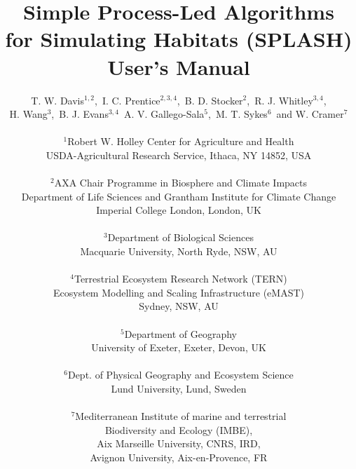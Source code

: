 \documentclass[11pt,twoside,a4paper,titlepage]{article}
\newcommand*{\TitleFont}{%
      \usefont{\encodingdefault}{\rmdefault}{b}{n}%
      \fontsize{16}{20}%
      \selectfont}
\begin{document}
\title{\TitleFont Simple Process-Led Algorithms\\ for Simulating Habitats (SPLASH)\\ User's Manual}
\author{
         T. W. Davis$^{1,2}$,~I. C. Prentice$^{2,3,4}$,~B. D. Stocker$^{2}$,~R. J. Whitley$^{3,4}$,\\
         H. Wang$^{3}$,~B. J. Evans$^{3,4}$~A. V. Gallego-Sala$^{5}$,~M. T. Sykes$^{6}$~and W. Cramer$^{7}$\\
         \\
         $^{1}$Robert W. Holley Center for Agriculture and Health\\
         USDA-Agricultural Research Service, Ithaca, NY 14852, USA\\
         \\
         $^{2}$AXA Chair Programme in Biosphere and Climate Impacts\\
         Department of Life Sciences and Grantham Institute for Climate Change\\
         Imperial College London, London, UK\\
         \\
         $^{3}$Department of Biological Sciences\\
         Macquarie University, North Ryde, NSW, AU\\
         \\
         $^{4}$Terrestrial Ecosystem Research Network (TERN)\\ 
         Ecosystem Modelling and Scaling Infrastructure (eMAST)\\
         Sydney, NSW, AU\\
         \\
         $^{5}$Department of Geography\\
         University of Exeter, Exeter, Devon, UK\\
         \\
         $^{6}$Dept. of Physical Geography and Ecosystem Science\\
         Lund University, Lund, Sweden\\
         \\
         $^{7}$Mediterranean Institute of marine and terrestrial\\ 
         Biodiversity and Ecology (IMBE),\\ 
         Aix Marseille University, CNRS, IRD,\\ 
         Avignon University, Aix-en-Provence, FR\\ 
         \\ 
         }
\end{document}
